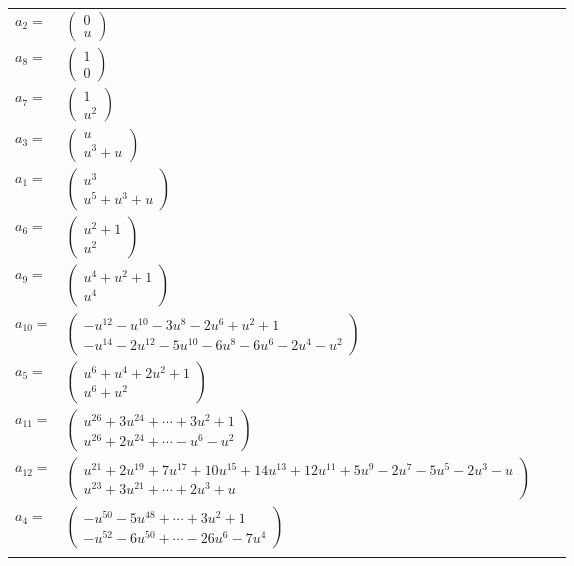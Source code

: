 \documentclass[1p]{elsarticle_modified}
\theoremstyle{definition}
\begin{document}
\begin{tabular}{m{7pt} m{180pt} m{7pt} m{180pt} }
\flushright $a_{2}=$&$\begin{pmatrix}0\\u\end{pmatrix}$ \\
\flushright $a_{8}=$&$\begin{pmatrix}1\\0\end{pmatrix}$ \\
\flushright $a_{7}=$&$\begin{pmatrix}1\\u^2\end{pmatrix}$ \\
\flushright $a_{3}=$&$\begin{pmatrix}u\\u^3+u\end{pmatrix}$ \\
\flushright $a_{1}=$&$\begin{pmatrix}u^3\\u^5+u^3+u\end{pmatrix}$ \\
\flushright $a_{6}=$&$\begin{pmatrix}u^2+1\\u^2\end{pmatrix}$ \\
\flushright $a_{9}=$&$\begin{pmatrix}u^4+u^2+1\\u^4\end{pmatrix}$ \\
\flushright $a_{10}=$&$\begin{pmatrix}- u^{12}- u^{10}-3 u^8-2 u^6+u^2+1\\- u^{14}-2 u^{12}-5 u^{10}-6 u^8-6 u^6-2 u^4- u^2\end{pmatrix}$ \\
\flushright $a_{5}=$&$\begin{pmatrix}u^6+u^4+2 u^2+1\\u^6+u^2\end{pmatrix}$ \\
\flushright $a_{11}=$&$\begin{pmatrix}u^{26}+3 u^{24}+\cdots+3 u^2+1\\u^{26}+2 u^{24}+\cdots- u^6- u^2\end{pmatrix}$ \\
\flushright $a_{12}=$&$\begin{pmatrix}u^{21}+2 u^{19}+7 u^{17}+10 u^{15}+14 u^{13}+12 u^{11}+5 u^9-2 u^7-5 u^5-2 u^3- u\\u^{23}+3 u^{21}+\cdots+2 u^3+u\end{pmatrix}$ \\
\flushright $a_{4}=$&$\begin{pmatrix}- u^{50}-5 u^{48}+\cdots+3 u^2+1\\- u^{52}-6 u^{50}+\cdots-26 u^6-7 u^4\end{pmatrix}$\\&\end{tabular}
\end{document}
